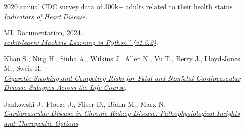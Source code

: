 \documentclass[12pt, a4paper]{article}
\begin{document}


\begin{thebibliography}{1}
  2020 annual CDC survey data of 300k+ adults related to their health status\\
  \href{https://www.kaggle.com/datasets/kamilpytlak/personal-key-indicators-of-heart-disease}{\emph{Indicators of Heart Disease}}. 

  ML Documentation, 2024.\\
  \href{https://scikit-learn.org/1.5/index.html}{\emph{scikit-learn: Machine Learning in Python” (v1.5.2)}}. 

  Khan S., Ning H., Sinha A., Wilkins J., Allen N., Vu T., Berry J., Lloyd‐Jones M., Sweis R.\\
  \href{https://www.ahajournals.org/doi/10.1161/JAHA.121.021751}{\emph{Cigarette Smoking and Competing Risks for Fatal and Nonfatal Cardiovascular Disease Subtypes Across the Life Course}}. 

  Jankowski J., Floege J., Fliser D., Böhm M., Marx N.\\
  \href{https://www.ahajournals.org/doi/10.1161/CIRCULATIONAHA.120.050686}{\emph{Cardiovascular Disease in Chronic Kidney Disease: Pathophysiological Insights and Therapeutic Options}}. 
\end{thebibliography}
\end{document}
